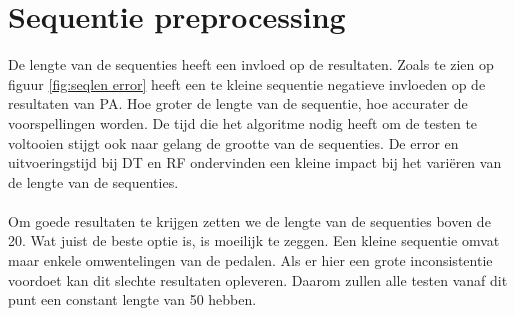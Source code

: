 \section{Sequentie preprocessing}
De lengte van de sequenties heeft een invloed op de resultaten. Zoals te zien op figuur \ref{fig:seqlen error} heeft een te kleine sequentie negatieve invloeden op de resultaten van PA. Hoe groter de lengte van de sequentie, hoe accurater de voorspellingen worden. De tijd die het algoritme nodig heeft om de testen te voltooien stijgt ook naar gelang de grootte van de sequenties. De error en uitvoeringstijd bij DT en RF ondervinden een kleine impact bij het variëren van de lengte van de sequenties. 
\\\\
Om goede resultaten te krijgen zetten we de lengte van de sequenties boven de 20. Wat juist de beste optie is, is moeilijk te zeggen. Een kleine sequentie omvat maar enkele omwentelingen van de pedalen. Als er hier een grote inconsistentie voordoet kan dit slechte resultaten opleveren. Daarom zullen alle testen vanaf dit punt een constant lengte van 50 hebben. 

